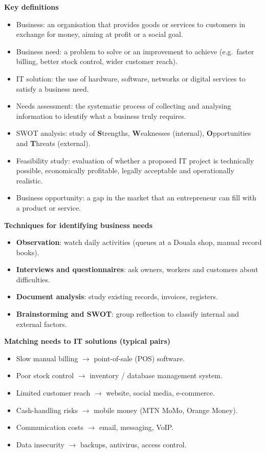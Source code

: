 \documentclass[11pt]{article}
\newcommand{\cle}[1]{{\popxbold\color{popdark}#1}}
\begin{document}
\begin{bilan}
\textbf{Key definitions}
\begin{itemize}
\item \cle{Business}: an organisation that provides goods or services to customers in exchange for money, aiming at profit or a social goal.
\item \cle{Business need}: a problem to solve or an improvement to achieve (e.g.\ faster billing, better stock control, wider customer reach).
\item \cle{IT solution}: the use of hardware, software, networks or digital services to satisfy a business need.
\item \cle{Needs assessment}: the systematic process of collecting and analysing information to identify what a business truly requires.
\item \cle{SWOT analysis}: study of \textbf{S}trengths, \textbf{W}eaknesses (internal), \textbf{O}pportunities and \textbf{T}hreats (external).
\item \cle{Feasibility study}: evaluation of whether a proposed IT project is technically possible, economically profitable, legally acceptable and operationally realistic.
\item \cle{Business opportunity}: a gap in the market that an entrepreneur can fill with a product or service.
\end{itemize}

\textbf{Techniques for identifying business needs}
\begin{itemize}
\item \textbf{Observation}: watch daily activities (queues at a Douala shop, manual record books).
\item \textbf{Interviews and questionnaires}: ask owners, workers and customers about difficulties.
\item \textbf{Document analysis}: study existing records, invoices, registers.
\item \textbf{Brainstorming and SWOT}: group reflection to classify internal and external factors.
\end{itemize}

\textbf{Matching needs to IT solutions (typical pairs)}
\begin{itemize}
\item Slow manual billing $\rightarrow$ point-of-sale (POS) software.
\item Poor stock control $\rightarrow$ inventory / database management system.
\item Limited customer reach $\rightarrow$ website, social media, e-commerce.
\item Cash-handling risks $\rightarrow$ mobile money (MTN MoMo, Orange Money).
\item Communication costs $\rightarrow$ email, messaging, VoIP.
\item Data insecurity $\rightarrow$ backups, antivirus, access control.
\end{itemize}


\end{bilan}
\end{document}
